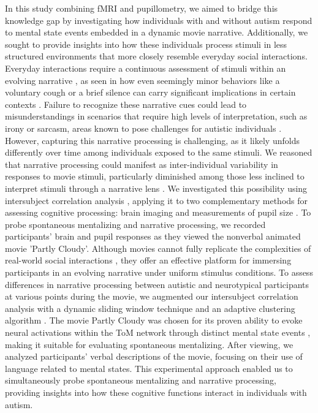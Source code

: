 In this study combining fMRI and pupillometry, we aimed to bridge this knowledge gap by investigating how individuals with and without autism respond to mental state events embedded in a dynamic movie narrative. Additionally, we sought to provide insights into how these individuals process stimuli in less structured environments that more closely resemble everyday social interactions. Everyday interactions require a continuous assessment of stimuli within an evolving narrative \citep{goffman1974,johnson2023,stolk2022}, as seen in how even seemingly minor behaviors like a voluntary cough or a brief silence can carry significant implications in certain contexts \citep{kendon94}. Failure to recognize these narrative cues could lead to misunderstandings in scenarios that require high levels of interpretation, such as irony or sarcasm, areas known to pose challenges for autistic individuals \citep{deliens2018,zalla2014}. However, capturing this narrative processing is challenging, as it likely unfolds differently over time among individuals exposed to the same stimuli. We reasoned that narrative processing could manifest as inter-individual variability in responses to movie stimuli, particularly diminished among those less inclined to interpret stimuli through a narrative lens \citep{chang2021,finn2018,owen2023,zhang2022}. We investigated this possibility using intersubject correlation analysis \citep{hasson2004}, applying it to two complementary methods for assessing cognitive processing: brain imaging and measurements of pupil size \citep{beatty1982}.
To probe spontaneous mentalizing and narrative processing, we recorded participants' brain and pupil responses as they viewed the nonverbal animated movie 'Partly Cloudy'\citep{jacoby2016,paunov2019}. Although movies cannot fully replicate the complexities of real-world social interactions \citep{wheatley2019}, they offer an effective platform for immersing participants in an evolving narrative under uniform stimulus conditions. To assess differences in narrative processing between autistic and neurotypical participants at various points during the movie, we augmented our intersubject correlation analysis with a dynamic sliding window technique and an adaptive clustering algorithm \citep{maris2007}. The movie Partly Cloudy was chosen for its proven ability to evoke neural activations within the ToM network through distinct mental state events \citep{jacoby2016,richardson2018}, making it suitable for evaluating spontaneous mentalizing. After viewing, we analyzed participants' verbal descriptions of the movie, focusing on their use of language related to mental states. This experimental approach enabled us to simultaneously probe spontaneous mentalizing and narrative processing, providing insights into how these cognitive functions interact in individuals with autism.

